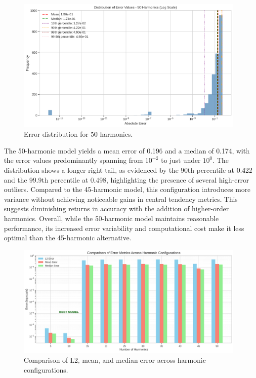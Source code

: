 \documentclass[preprint,12pt]{elsarticle}
\begin{document}
\begin{figure}[t]
    \centering
    \includegraphics[width=0.9\linewidth]{figures/error_distribution_50h.png}
    \caption{Error distribution for 50 harmonics.}
    \label{fig:error_50h}
\end{figure}

The 50-harmonic model yields a mean error of 0.196 and a median of 0.174, with the error values predominantly spanning from \(10^{-2}\) to just under \(10^{0}\). The distribution shows a longer right tail, as evidenced by the 90th percentile at 0.422 and the 99.9th percentile at 0.498, highlighting the presence of several high-error outliers. Compared to the 45-harmonic model, this configuration introduces more variance without achieving noticeable gains in central tendency metrics. This suggests diminishing returns in accuracy with the addition of higher-order harmonics. Overall, while the 50-harmonic model maintains reasonable performance, its increased error variability and computational cost make it less optimal than the 45-harmonic alternative.

\begin{figure}[t]
    \centering
    \includegraphics[width=0.9\linewidth]{figures/error_metrics_comparison.png}
    \caption{Comparison of L2, mean, and median error across harmonic configurations.}
    \label{fig:error_metrics}
\end{figure}
\end{document}
